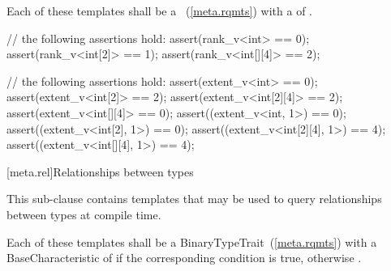 \pnum
Each of these templates shall be a ~(\ref{meta.rqmts}) with a
 of .

\pnum
\begin{example}
\begin{codeblock}
// the following assertions hold:
assert(rank_v<int> == 0);
assert(rank_v<int[2]> == 1);
assert(rank_v<int[][4]> == 2);
\end{codeblock}
\end{example}

\pnum
\begin{example}
\begin{codeblock}
 // the following assertions hold:
assert(extent_v<int> == 0);
assert(extent_v<int[2]> == 2);
assert(extent_v<int[2][4]> == 2);
assert(extent_v<int[][4]> == 0);
assert((extent_v<int, 1>) == 0);
assert((extent_v<int[2], 1>) == 0);
assert((extent_v<int[2][4], 1>) == 4);
assert((extent_v<int[][4], 1>) == 4);
\end{codeblock}
\end{example}

[meta.rel]{Relationships between types}

\pnum
This sub-clause contains templates that may be used to query
relationships between types at compile time.

\pnum
Each of these templates shall be a
BinaryTypeTrait~(\ref{meta.rqmts})
with a BaseCharacteristic of
 if the corresponding condition is true, otherwise
.

